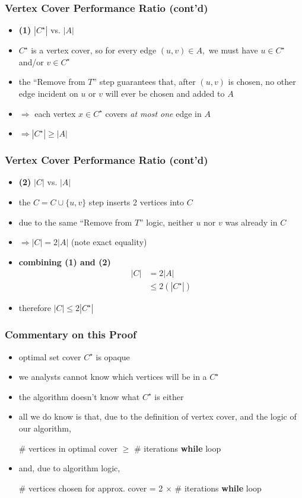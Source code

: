 \documentclass[10pt,aspectratio=169]{beamer}
\begin{document}
\begin{frame} \frametitle{Vertex Cover Performance Ratio (cont'd)}
\begin{itemize}
  \item \textbf{(1)} $|C^\star|$ vs. $|A|$
  \item $C^\star$ is a vertex cover, so for every edge $(u, v) \in A,$ we must have
    $u \in C^\star$ and/or $v \in C^\star$
  \item the ``Remove from $T$'' step guarantees that, after $(u, v)$ is chosen,
    no other edge incident on $u$ or $v$ will ever be chosen and added to $A$
  \item $\Rightarrow$ each vertex $x \in C^\star$ covers \emph{at most one} edge in $A$
  \item $\Rightarrow |C^\star| \geq |A|$
\end{itemize}
\end{frame}

\begin{frame} \frametitle{Vertex Cover Performance Ratio (cont'd)}
\begin{itemize}
  \item \textbf{(2)} $|C|$ vs. $|A|$
  \item the $C = C \cup \{u, v \}$ step inserts 2 vertices into $C$
  \item  due to the same ``Remove from $T$'' logic, neither $u$ nor $v$ was already
    in $C$
  \item $\Rightarrow |C| = 2|A|$ (note exact equality)
  \item \textbf{combining (1) and (2)}
  \begin{align*}
    |C| &= 2|A| \\
    & \leq 2(|C^\star|)
  \end{align*}
  \item therefore $|C| \leq 2 |C^\star|$
\end{itemize}
\end{frame}

\begin{frame} \frametitle{Commentary on this Proof}
\begin{itemize}
  \item optimal set cover $C^\star$ is opaque
  \item we analysts cannot know which vertices will be in a $C^\star$
  \item the algorithm doesn't know what $C^\star$ is either
  \item all we do know is that, due to the definition of vertex cover, and
    the logic of our algorithm,
    \begin{center}
      \# vertices in optimal cover $\geq$ \# iterations \textbf{while} loop
    \end{center}
  \item and, due to algorithm logic,
  \begin{center}
    \# vertices chosen for approx. cover = 2 $\times$ \# iterations \textbf{while} loop
  \end{center}
\end{itemize}
\end{frame}
\end{document}

